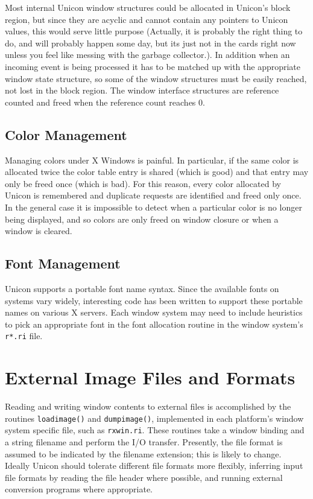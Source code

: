 Most internal Unicon window structures could be allocated in Unicon's
block region, but since they are acyclic and cannot contain any
pointers to Unicon values, this would serve little purpose (Actually,
it is probably the right thing to do, and will probably happen some
day, but its just not in the cards right now unless you feel like
messing with the garbage collector.). In addition when an incoming
event is being processed it has to be matched up with the appropriate
window state structure, so some of the window structures must be
easily reached, not lost in the block region. The window interface
structures are reference counted and freed when the reference count
reaches 0.

\subsection{Color Management}

Managing colors under X Windows is painful. In particular, if the same
color is allocated twice the color table entry is shared (which is
good) and that entry may only be freed once (which is bad). For this
reason, every color allocated by Unicon is remembered and duplicate
requests are identified and freed only once. In the general case it is
impossible to detect when a particular color is no longer being
displayed, and so colors are only freed on window closure or when a
window is cleared.

\subsection{Font Management}

Unicon supports a portable font name syntax. Since the available fonts
on systems vary widely, {\textquotedbl}interesting{\textquotedbl} code
has been written to support these portable names on various X servers.
Each window system may need to include heuristics to pick an
appropriate font in the font allocation routine in the window system's
\texttt{r*.ri} file.

\section{External Image Files and Formats}

Reading and writing window contents to external files is accomplished
by the routines \texttt{loadimage()} and \texttt{dumpimage()},
implemented in each platform's window system specific file, such as
\texttt{rxwin.ri}. These routines take a window binding and a string
filename and perform the I/O transfer. Presently, the file format is
assumed to be indicated by the filename extension; this is likely to
change. Ideally Unicon should tolerate different file formats more
flexibly, inferring input file formats by reading the file header
where possible, and running external conversion programs where
appropriate.

